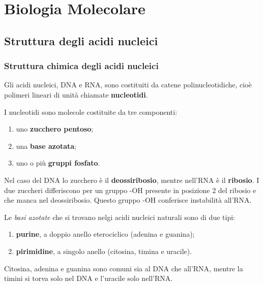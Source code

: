 \documentclass[]{article}
\begin{document}
\section{Biologia Molecolare}\label{biologia-molecolare}

\subsection{Struttura degli acidi
nucleici}\label{struttura-degli-acidi-nucleici}

\subsubsection{Struttura chimica degli acidi
nucleici}\label{struttura-chimica-degli-acidi-nucleici}

Gli acidi nucleici, DNA e RNA, sono costituiti da catene
polinucleotidiche, cioè polimeri lineari di unità chiamate
\textbf{nucleotidi}.

I nucleotidi sono molecole costituite da tre componenti:

\begin{enumerate}
\def\labelenumi{\arabic{enumi}.}
\itemsep1pt\parskip0pt
\item
  uno \textbf{zucchero pentoso};
\item
  una \textbf{base azotata};
\item
  uno o più \textbf{gruppi fosfato}.
\end{enumerate}

Nel caso del DNA lo zucchero è il \textbf{deossiribosio}, mentre
nell'RNA è il \textbf{ribosio}. I due zuccheri differiscono per un
gruppo -OH presente in posizione 2 del ribosio e che manca nel
deossiribosio. Questo gruppo -OH conferisce instabilità all'RNA.

Le \emph{basi azotate} che si trovano nelgi acidi nucleici naturali sono
di due tipi:

\begin{enumerate}
\def\labelenumi{\arabic{enumi}.}
\itemsep1pt\parskip0pt
\item
  \textbf{purine}, a doppio anello eterociclico (adenina e guanina);
\item
  \textbf{pirimidine}, a singolo anello (citosina, timina e uracile).
\end{enumerate}

Citosina, adenina e guanina sono comuni sia al DNA che all'RNA, mentre
la timini si torva solo nel DNA e l'uracile solo nell'RNA.
\end{document}
